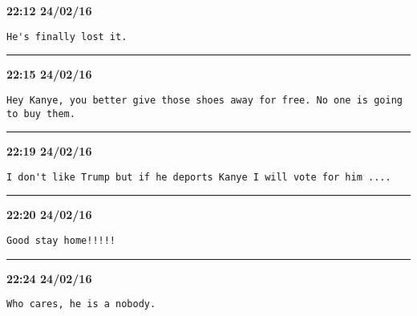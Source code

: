 \begin{adjustwidth}{0cm}{0cm}
\footnotesize \textbf{22:12 24/02/16}

\begin{lstlisting}[breaklines, breakatwhitespace, basicstyle=\small, frame=leftline]
He's finally lost it.
\end{lstlisting}
\end{adjustwidth}

\hrule%

\begin{adjustwidth}{0cm}{0cm}
\footnotesize \textbf{22:15 24/02/16}

\begin{lstlisting}[breaklines, breakatwhitespace, basicstyle=\small, frame=leftline]
Hey Kanye, you better give those shoes away for free. No one is going to buy them.
\end{lstlisting}
\end{adjustwidth}

\hrule%

\begin{adjustwidth}{0cm}{0cm}
\footnotesize \textbf{22:19 24/02/16}

\begin{lstlisting}[breaklines, breakatwhitespace, basicstyle=\small, frame=leftline]
I don't like Trump but if he deports Kanye I will vote for him ....
\end{lstlisting}
\end{adjustwidth}

\hrule%

\begin{adjustwidth}{0cm}{0cm}
\footnotesize \textbf{22:20 24/02/16}

\begin{lstlisting}[breaklines, breakatwhitespace, basicstyle=\small, frame=leftline]
Good stay home!!!!!
\end{lstlisting}
\end{adjustwidth}

\hrule%

\begin{adjustwidth}{0cm}{0cm}
\footnotesize \textbf{22:24 24/02/16}

\begin{lstlisting}[breaklines, breakatwhitespace, basicstyle=\small, frame=leftline]
Who cares, he is a nobody.
\end{lstlisting}
\end{adjustwidth}

